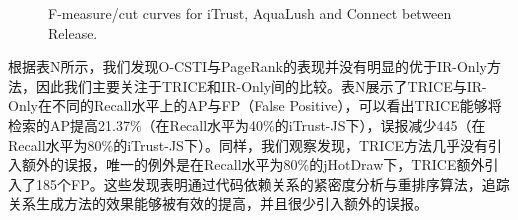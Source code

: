 \begin{figure}[t]
{   }
   \caption{F-measure/cut curves for iTrust, AquaLush and Connect between Release.}
   \label{fmeasure_release}
\end{figure}

根据表N所示，我们发现O-CSTI与PageRank的表现并没有明显的优于IR-Only方法，因此我们主要关注于TRICE和IR-Only间的比较。表N展示了TRICE与IR-Only在不同的Recall水平上的AP与FP（False Positive），可以看出TRICE能够将检索的AP提高21.37\%（在Recall水平为40\%的iTrust-JS下），误报减少445（在Recall水平为80\%的iTrust-JS下）。同样，我们观察发现，TRICE方法几乎没有引入额外的误报，唯一的例外是在Recall水平为80\%的jHotDraw下，TRICE额外引入了185个FP。这些发现表明通过代码依赖关系的紧密度分析与重排序算法，追踪关系生成方法的效果能够被有效的提高，并且很少引入额外的误报。

